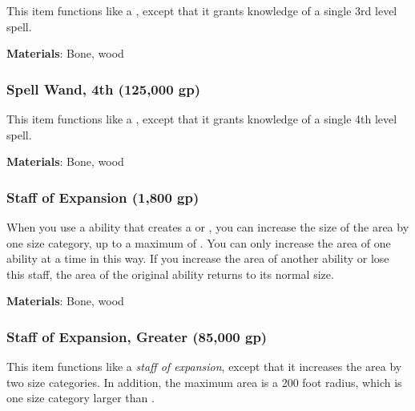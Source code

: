 This item functions like a , except that it grants knowledge of a single 3rd level spell.



\vspace{0.25em}
\textbf{Materials}: Bone, wood


\lowercase{\hypertarget{item:Spell Wand, 4th}{}}\label{item:Spell Wand, 4th}
\hypertarget{item:Spell Wand, 4th}{\subsubsection{Spell Wand, 4th\hfill{} (125,000 gp)}}

This item functions like a , except that it grants knowledge of a single 4th level spell.



\vspace{0.25em}
\textbf{Materials}: Bone, wood


\lowercase{\hypertarget{item:Staff of Expansion}{}}\label{item:Staff of Expansion}
\hypertarget{item:Staff of Expansion}{\subsubsection{Staff of Expansion\hfill{} (1,800 gp)}}

When you use a  ability that creates a  or , you can increase the size of the area by one size category, up to a maximum of \areahuge.
You can only increase the area of one ability at a time in this way.
If you increase the area of another ability or lose this staff, the area of the original ability returns to its normal size.



\vspace{0.25em}
\textbf{Materials}: Bone, wood


\lowercase{\hypertarget{item:Staff of Expansion, Greater}{}}\label{item:Staff of Expansion, Greater}
\hypertarget{item:Staff of Expansion, Greater}{\subsubsection{Staff of Expansion, Greater\hfill{} (85,000 gp)}}

This item functions like a \textit{staff of expansion}, except that it increases the area by two size categories.
In addition, the maximum area is a 200 foot radius, which is one size category larger than \areahuge.



